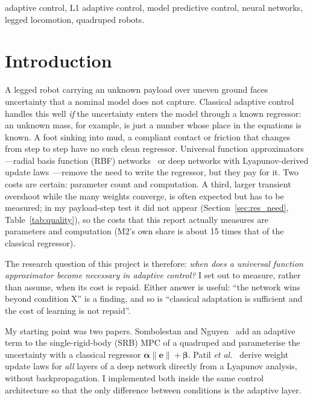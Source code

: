 \documentclass[conference]{IEEEtran}
\begin{document}
\begin{IEEEkeywords}
adaptive control, L1 adaptive control, model predictive control,
neural networks, legged locomotion, quadruped robots.
\end{IEEEkeywords}

\section{Introduction}

A legged robot carrying an unknown payload over uneven ground faces
uncertainty that a nominal model does not capture. Classical adaptive
control handles this well \emph{if} the uncertainty enters the model
through a known regressor: an unknown mass, for example, is just a
number whose place in the equations is known. A foot sinking into mud,
a compliant contact or friction that changes from step to step have no
such clean regressor. Universal function approximators---radial basis
function (RBF) networks~\cite{lewis1996} or deep networks with
Lyapunov-derived update laws~\cite{patil2022}---remove the need to write
the regressor, but they pay for it. Two costs are certain: parameter count
and computation. A third, larger transient overshoot while the many
weights converge, is often expected but has to be measured; in my
payload-step test it did not appear (Section~\ref{sec:res_need},
Table~\ref{tab:quality}), so
the costs that this report actually measures are parameters and
computation (M2's own share is about 15 times that of the classical
regressor).

The research question of this project is therefore:
\emph{when does a universal function approximator become necessary in
adaptive control?} I set out to measure, rather than assume, when its
cost is repaid. Either answer is useful: ``the network wins beyond
condition X'' is a finding, and so is ``classical adaptation is
sufficient and the cost of learning is not repaid''.

My starting point was two papers. Sombolestan and
Nguyen~\cite{sombolestan2024} add an adaptive term to the
single-rigid-body (SRB) MPC of a quadruped and parameterise the
uncertainty with a classical regressor $\bm\alpha\|\bm e\|+\bm\beta$.
Patil \emph{et al.}~\cite{patil2022} derive weight update laws for
\emph{all} layers of a deep network directly from a Lyapunov analysis,
without backpropagation. I implemented both inside the same control
architecture so that the only difference between conditions is the
adaptive layer.
\end{document}
